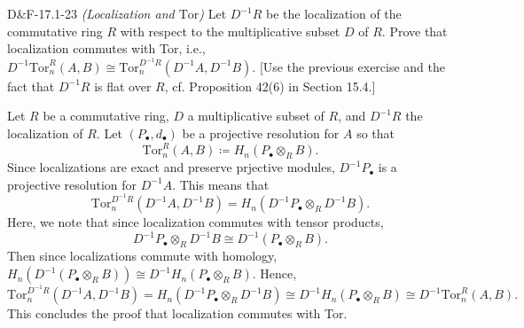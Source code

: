 \documentclass{article}
\newcommand{\tor}{\text{Tor}}
\begin{document}
	\begin{prb}{D\&F-17.1-23}
		\textit{(Localization and $\tor$)} Let $D^{-1}R$ be the localization of the commutative ring $R$ with respect to the multiplicative subset $D$ of $R$. Prove that localization commutes with Tor, i.e., \newline$D^{-1}\tor_{n}^{R}(A,B) \cong \tor_{n}^{D^{-1}R}(D^{-1}A,D^{-1}B)$. [Use the previous exercise and the fact that $D^{-1}R$ is flat over $R$, cf. Proposition 42(6) in Section 15.4.]
	\end{prb}
	
	Let $R$ be a commutative ring, $D$ a multiplicative subset of $R$, and $D^{-1}R$ the localization of $R$. Let $(P_{\bullet}, d_{\bullet})$ be a projective resolution for $A$ so that 
	\begin{equation*}
		\tor_{n}^{R}(A, B) \coloneqq H_{n}(P_{\bullet}\otimes_{R} B). 
	\end{equation*}
	Since localizations are exact and preserve prjective modules, $D^{-1}P_{\bullet}$ is a projective resolution for $D^{-1}A$. This means that 
	\begin{equation*}
		\tor_{n}^{D^{-1}R}(D^{-1}A,D^{-1}B) = H_{n}(D^{-1}P_{\bullet} \otimes_{R} D^{-1}B). 
	\end{equation*}
	Here, we note that since localization commutes with tensor products, 
	\begin{equation*}
		D^{-1}P_{\bullet} \otimes_{R} D^{-1}B \cong D^{-1}(P_{\bullet} \otimes_{R} B). 
	\end{equation*}
	Then since localizations commute with homology, $H_{n}(D^{-1}(P_{\bullet} \otimes_{R} B)) \cong D^{-1}H_{n}(P_{\bullet} \otimes_{R} B)$. Hence, 
	\begin{equation*}
		\tor_{n}^{D^{-1}R}(D^{-1}A,D^{-1}B) = H_{n}(D^{-1}P_{\bullet}\otimes_{R}D^{-1}B) \cong D^{-1}H_{n}(P_{\bullet} \otimes_{R} B) \cong D^{-1}\tor_{n}^{R}(A, B). 
	\end{equation*}
	This concludes the proof that localization commutes with Tor. 
	
\end{document}
